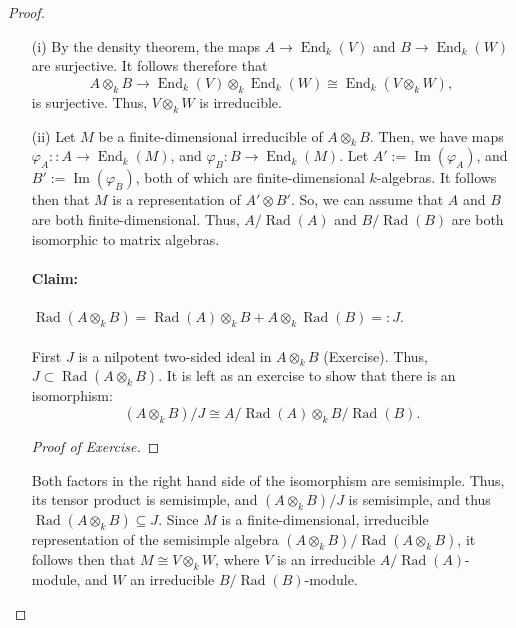 \documentclass[a4paper]{report}
\theoremstyle{definition}
\theoremstyle{remark}
\theoremstyle{proposition}
\theoremstyle{conjecture}
\theoremstyle{lemma}
\theoremstyle{corollary}
\theoremstyle{exercise}
\theoremstyle{example}
\newcommand{\on}{\operatorname}
\begin{document}
\begin{proof}
    \leavevmode
    \begin{itemize}
        \item[(i)] By the density theorem, the maps $A \to \on{End}_k(V)$
            and $B \to \on{End}_k(W)$ are surjective.
            It follows therefore that $$A\otimes_kB \to\on{End}_k(V)\otimes_k\on{End}_k(W)\cong \on{End}_k(V\otimes_kW),$$
            is surjective. Thus, $V\otimes_kW$ is irreducible.
        \item[(ii)] Let $M$ be a finite-dimensional irreducible of 
            $A\otimes_kB$. Then, we have maps 
            $\varphi_A: : A \to \on{End}_k(M)$,
            and $\varphi_B : B \to \on{End}_k(M)$.
            Let $A' := \on{Im}(\varphi_A)$, and $B' := \on{Im}(\varphi_B)$,
            both of which are finite-dimensional $k$-algebras.
            It follows then that $M$ is a representation of $A'\otimes B'$.
            So, we can assume that $A$ and $B$ are both finite-dimensional.
            Thus, $A/\on{Rad}(A)$ and $B/\on{Rad}(B)$ are both 
            isomorphic to matrix algebras. 
            \paragraph{Claim:} $\on{Rad}(A\otimes_kB) = \on{Rad}(A)\otimes_kB + A\otimes_k \on{Rad}(B) =: J$.\\\\
            First $J$ is a nilpotent two-sided ideal in $A\otimes_kB$ (Exercise).
            Thus, $J \subset \on{Rad}(A\otimes_kB)$. 
            It is left as an exercise to show that there is an isomorphism:
            $$(A\otimes_k B)/J \cong A/\on{Rad}(A) \otimes_k B/\on{Rad}(B).$$
            \begin{proof}[Proof of Exercise]
            \end{proof}
            Both factors in the right hand side of the isomorphism are 
            semisimple.
            Thus, its tensor product is semisimple, and $(A\otimes_kB)/J$ 
            is semisimple, and thus 
            $\on{Rad}(A\otimes_kB)\subseteq J$.
            Since $M$ is a finite-dimensional, irreducible representation of 
            the semisimple algebra
            $(A\otimes_kB)/\on{Rad}(A\otimes_kB)$, it follows then that 
            $M \cong V\otimes_kW$, where $V$ is an irreducible 
            $A/\on{Rad}(A)$-module, and $W$ an irreducible 
            $B/\on{Rad}(B)$-module.
    \end{itemize}
\end{proof}
\end{document}
